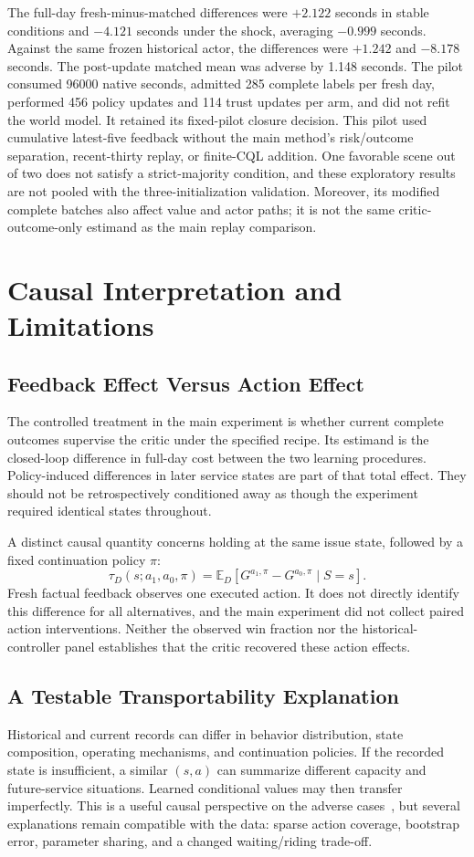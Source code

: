\documentclass[journal]{IEEEtran}
\newcommand{\E}{\mathbb{E}}
\begin{document}
The full-day fresh-minus-matched differences were $+2.122$ seconds in stable conditions and $-4.121$ seconds under the shock, averaging $-0.999$ seconds. Against the same frozen historical actor, the differences were $+1.242$ and $-8.178$ seconds. The post-update matched mean was adverse by 1.148 seconds. The pilot consumed 96000 native seconds, admitted 285 complete labels per fresh day, performed 456 policy updates and 114 trust updates per arm, and did not refit the world model. It retained its fixed-pilot closure decision. This pilot used cumulative latest-five feedback without the main method's risk/outcome separation, recent-thirty replay, or finite-CQL addition. One favorable scene out of two does not satisfy a strict-majority condition, and these exploratory results are not pooled with the three-initialization validation. Moreover, its modified complete batches also affect value and actor paths; it is not the same critic-outcome-only estimand as the main replay comparison.

\section{Causal Interpretation and Limitations}
\subsection{Feedback Effect Versus Action Effect}
The controlled treatment in the main experiment is whether current complete outcomes supervise the critic under the specified recipe. Its estimand is the closed-loop difference in full-day cost between the two learning procedures. Policy-induced differences in later service states are part of that total effect. They should not be retrospectively conditioned away as though the experiment required identical states throughout.

A distinct causal quantity concerns holding at the same issue state, followed by a fixed continuation policy $\pi$:
\begin{equation}
 \tau_D(s;a_1,a_0,\pi)=
 \E_D[G^{a_1,\pi}-G^{a_0,\pi}\mid S=s].
\end{equation}
Fresh factual feedback observes one executed action. It does not directly identify this difference for all alternatives, and the main experiment did not collect paired action interventions. Neither the observed win fraction nor the historical-controller panel establishes that the critic recovered these action effects.

\subsection{A Testable Transportability Explanation}
Historical and current records can differ in behavior distribution, state composition, operating mechanisms, and continuation policies. If the recorded state is insufficient, a similar $(s,a)$ can summarize different capacity and future-service situations. Learned conditional values may then transfer imperfectly. This is a useful causal perspective on the adverse cases~\cite{bareinboim2020}, but several explanations remain compatible with the data: sparse action coverage, bootstrap error, parameter sharing, and a changed waiting/riding trade-off.
\end{document}
